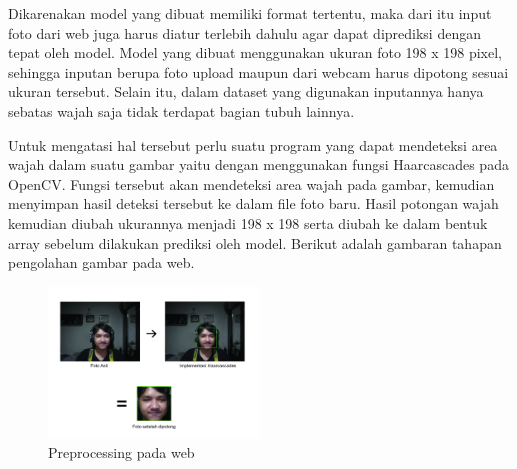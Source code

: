 Dikarenakan model yang dibuat memiliki format tertentu, maka dari itu input foto dari web juga harus diatur terlebih dahulu agar dapat diprediksi dengan 
tepat oleh model. Model yang dibuat menggunakan ukuran foto 198 x 198 pixel, sehingga inputan berupa foto upload maupun dari webcam harus dipotong sesuai ukuran 
tersebut. Selain itu, dalam dataset yang digunakan inputannya hanya sebatas wajah saja tidak terdapat bagian tubuh lainnya. \par

Untuk mengatasi hal tersebut perlu suatu program yang dapat mendeteksi area wajah dalam suatu gambar yaitu dengan menggunakan fungsi Haarcascades pada OpenCV. 
Fungsi tersebut akan mendeteksi area wajah pada gambar, kemudian menyimpan hasil deteksi tersebut ke dalam file foto baru. Hasil potongan wajah 
kemudian diubah ukurannya menjadi 198 x 198 serta diubah ke dalam bentuk array sebelum dilakukan prediksi oleh model. Berikut adalah gambaran tahapan pengolahan 
gambar pada web.

\begin{figure} [ht]
  \centering
  \includegraphics[width=0.5\textwidth]{gambar/preprocessingWeb.jpg}

  \caption{Preprocessing pada web}
  \label{fig:preprocessingWeb}
\end{figure}
